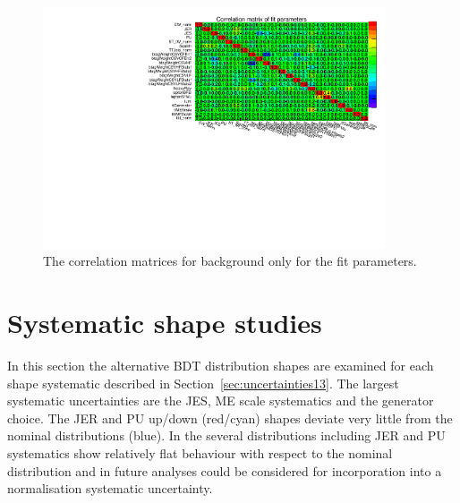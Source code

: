 \begin{figure}[ht!]
    \includegraphics[width=0.9\textwidth]{images/Run2/FitCorr.pdf}
    \caption{The correlation matrices for background only for the fit parameters.}
    \label{fig:FitCorr}
\end{figure}

\section{Systematic shape studies}

In this section the alternative BDT distribution shapes are examined for each shape systematic described in Section~\ref{sec:uncertainties13}. The largest systematic uncertainties are the JES, ME scale systematics and the \ttbar generator choice. The JER and PU up/down (red/cyan) shapes deviate very little from the nominal distributions (blue). In \ttbar the several distributions including JER and PU systematics show relatively flat behaviour with respect to the nominal distribution and in future analyses could be considered for incorporation into a normalisation systematic uncertainty.

